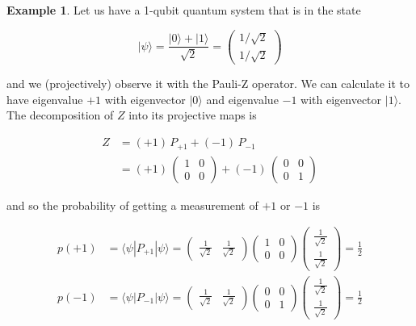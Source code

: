 \documentclass{article}
\theoremstyle{definition}
\newtheorem{example}{Example}[section]
\begin{document}
    \begin{example}
      Let us have a 1-qubit quantum system that is in the state

        \[|\psi \rangle = \frac{|0\rangle + |1 \rangle}{\sqrt{2}} = \begin{pmatrix} 1/\sqrt{2} \\ 1/\sqrt{2} \end{pmatrix}\]

      and we (projectively) observe it with the Pauli-Z operator. We can calculate it to have eigenvalue $+1$ with eigenvector $|0\rangle$ and eigenvalue $-1$ with eigenvector $|1\rangle$. The decomposition of $Z$ into its projective maps is

      \begin{align*}
        Z & = (+1) \, P_{+1} + (-1)\, P_{-1} \\
        & = (+1) \, \begin{pmatrix} 1&0\\0&0 \end{pmatrix} + (-1)\, \begin{pmatrix} 0&0\\0&1 \end{pmatrix}
      \end{align*}

      and so the probability of getting a measurement of $+1$ or $-1$ is

      \begin{align*}
        p(+1) & = \langle \psi | P_{+1} | \psi \rangle = \begin{pmatrix} \frac{1}{\sqrt{2}} & \frac{1}{\sqrt{2}} \end{pmatrix} \begin{pmatrix} 1&0\\0&0 \end{pmatrix} \begin{pmatrix} \frac{1}{\sqrt{2}} \\ \frac{1}{\sqrt{2}} \end{pmatrix} = \frac{1}{2} \\
        p(-1) & = \langle \psi | P_{-1} | \psi \rangle = \begin{pmatrix} \frac{1}{\sqrt{2}} & \frac{1}{\sqrt{2}} \end{pmatrix} \begin{pmatrix} 0&0\\0&1 \end{pmatrix} \begin{pmatrix} \frac{1}{\sqrt{2}} \\ \frac{1}{\sqrt{2}} \end{pmatrix} = \frac{1}{2}
      \end{align*}
    \end{example}
\end{document}
